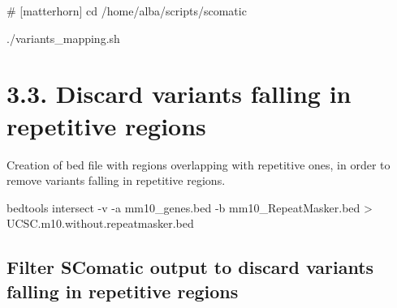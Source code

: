 \documentclass[
  letterpaper,
  DIV=11,
  numbers=noendperiod]{scrreprt}
\newenvironment{Shaded}{\begin{snugshade}}{\end{snugshade}}
\newcommand{\NormalTok}[1]{\textcolor[rgb]{0.00,0.23,0.31}{#1}}
\begin{document}
\begin{Shaded}
\end{Shaded}

\begin{Shaded}
\begin{Highlighting}[]
\NormalTok{\# [matterhorn]}
\NormalTok{cd /home/alba/scripts/scomatic}

\NormalTok{./variants\_mapping.sh}
\end{Highlighting}
\end{Shaded}

\section{3.3. Discard variants falling in repetitive
regions}\label{discard-variants-falling-in-repetitive-regions}

Creation of bed file with regions overlapping with repetitive ones, in
order to remove variants falling in repetitive regions.

\begin{Shaded}
\begin{Highlighting}[]
\NormalTok{bedtools intersect {-}v {-}a mm10\_genes.bed {-}b mm10\_RepeatMasker.bed \textgreater{} UCSC.m10.without.repeatmasker.bed}
\end{Highlighting}
\end{Shaded}

\subsection{Filter SComatic output to discard variants falling in
repetitive
regions}\label{filter-scomatic-output-to-discard-variants-falling-in-repetitive-regions}
\end{document}
